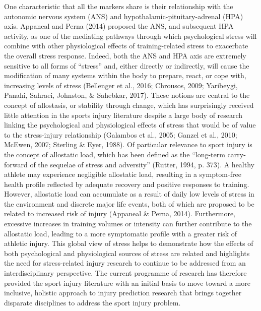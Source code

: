 \documentclass[man,floatsintext]{apa6}
\begin{document}
One characteristic that all the markers share is their relationship with the autonomic nervous system (ANS) and hypothalamic-pituitary-adrenal (HPA) axis.
Appaneal and Perna (2014) proposed the ANS, and subsequent HPA activity, as one of the mediating pathways through which psychological stress will combine with other physiological effects of training-related stress to exacerbate the overall stress response.
Indeed, both the ANS and HPA axis are extremely sensitive to all forms of \enquote{stress} and, either directly or indirectly, will cause the modification of many systems within the body to prepare, react, or cope with, increasing levels of stress (Bellenger et al., 2016; Chrousos, 2009; Yaribeygi, Panahi, Sahraei, Johnston, \& Sahebkar, 2017).
These notions are central to the concept of allostasis, or stability through change, which has surprisingly received little attention in the sports injury literature despite a large body of research linking the psychological and physiological effects of stress that would be of value to the stress-injury relationship (Galambos et al., 2005; Ganzel et al., 2010; McEwen, 2007; Sterling \& Eyer, 1988).
Of particular relevance to sport injury is the concept of allostatic load, which has been defined as the \enquote{long-term carry-forward of the sequelae of stress and adversity} (Rutter, 1994, p. 373).
A healthy athlete may experience negligible allostatic load, resulting in a symptom-free health profile reflected by adequate recovery and positive responses to training.
However, allostatic load can accumulate as a result of daily low levels of stress in the environment and discrete major life events, both of which are proposed to be related to increased risk of injury (Appaneal \& Perna, 2014).
Furthermore, excessive increases in training volumes or intensity can further contribute to the allostatic load, leading to a more symptomatic profile with a greater risk of athletic injury.
This global view of stress helps to demonstrate how the effects of both psychological and physiological sources of stress are related and highlights the need for stress-related injury research to continue to be addressed from an interdisciplinary perspective.
The current programme of research has therefore provided the sport injury literature with an initial basis to move toward a more inclusive, holistic approach to injury prediction research that brings together disparate disciplines to address the sport injury problem.
\end{document}
